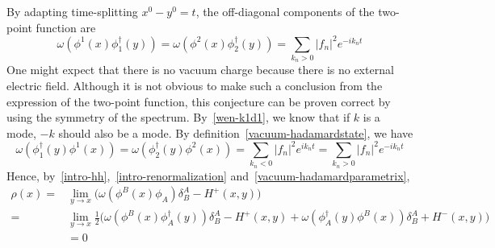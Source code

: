 By adapting time-splitting $x^0 - y^0 = t$, the off-diagonal components of the two-point function are
\begin{equation*}
\omega(\phi^1(x)\phi^\dagger_1(y)) = \omega(\phi^2(x)\phi^\dagger_2(y)) = 
 \sum_{k_n>0} |f_n|^2 e^{-ik_nt}
\end{equation*} 
One might expect that there is no vacuum charge because there is no external electric field. 
Although it is not obvious to make such a conclusion from the expression of the two-point function, 
this conjecture can be proven correct by using the symmetry of the spectrum.
By~\cref{wen-k1d1}, we know that if $k$ is a mode, $-k$ should also be a mode.
By definition~\cref{vacuum-hadamardstate}, we have
\begin{equation*}
\omega(\phi_1^\dagger(y)\phi^1(x)) = \omega(\phi_2^\dagger(y)\phi^2(x)) = 
 \sum_{k_n< 0} |f_n|^2 e^{ik_nt}
= \sum_{k_n>0} |f_n|^2 e^{-ik_nt}
\end{equation*}
Hence, by~\cref{intro-hh},~\cref{intro-renormalization} and~\cref{vacuum-hadamardparametrix}, 
\begin{equation*}
\begin{split}
\rho(x) = & \lim_{y\rightarrow x}\big(\omega(\phi^B(x)\phi_A)\delta^A_B - H^+(x,y)\big) \\
= & \lim_{y\rightarrow x}\frac{1}{2}\big( \omega(\phi^B(x)\phi_A^\dagger(y))\delta^A_B-H^+(x,y) + \omega(\phi_A^\dagger(y)\phi^B(x))\delta^A_B + H^-(x,y) \big)  \\
& = 0
\end{split} 
\end{equation*}
